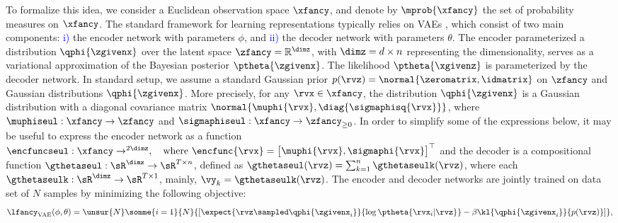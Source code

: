 \documentclass{article} %
\theoremstyle{plain}
\theoremstyle{definition}
\theoremstyle{remark}
\numberwithin{equation}{section}
\begin{document}
To formalize this idea, we consider a Euclidean observation space $\xfancy$, and denote by $\mprob{\xfancy}$ the set of probability measures on $\xfancy$. %
The standard framework for learning representations typically relies on VAEs \citep{Kingma2014}, which consist of two main components: \textcolor{blue}{i)} the encoder network with parameters $\phi$, and \textcolor{blue}{ii)} the decoder network with parameters $\theta$. The encoder parameterized a distribution $\qphi{\zgivenx}$ over the latent space $\zfancy=\mathbb{R}^{\dimz}$, with $\dimz=d \times n$ representing the dimensionality, serves as a variational approximation of the Bayesian posterior $\ptheta{\zgivenx}$. The likelihood $\ptheta{\xgivenz}$ is parameterized by the decoder network. In standard setup, we assume a standard Gaussian prior $p(\rvz)=\normal{\zeromatrix, \idmatrix}$ on $\zfancy$ and Gaussian distributions $\qphi{\zgivenx}$. More precisely, for any $\rvx \in \xfancy$, the distribution $\qphi{\zgivenx}$ is a Gaussian distribution with a diagonal covariance matrix $\normal{\muphi{\rvx}, \diag{\sigmaphisq{\rvx}}}$, where $\muphiseul: \xfancy \rightarrow \zfancy$ and $\sigmaphiseul : \xfancy \rightarrow \zfancy_{\geq 0}$. %
In order to simplify some of the expressions below, it may be useful to express the encoder network as a function 
$\encfuncseul : \xfancy \rightarrow \real^{2\dimz}, \quad \text{where } 
\encfunc{\rvx} = \begin{bmatrix}
\muphi{\rvx}, \sigmaphi{\rvx}\end{bmatrix}^\top$ and the decoder is a compositional function $\gthetaseul: \sR^{\dimz} \to \sR^{T \times n}$, defined as $\gthetaseul(\rvz) = \sum_{k=1}^{n}\gthetaseulk(\rvz)$, where each $\gthetaseulk: \sR^{\dimz} \to \sR^{T \times 1}$, mainly, $\vy_k = \gthetaseulk(\rvz)$. 
The encoder and decoder networks are jointly trained on data set of $N$ samples by minimizing the following objective: 
\begin{equation}\label{eq-loss-vae}
\lfancy_\text{VAE}(\phi,\theta) = \unsur{N} \somme{i=1}{N}{  \left[   \expect{\rvz \sampled \qphi{\zgivenx_i}}{\log \ptheta{\rvx_i| \rvz}} - \beta \kl{\qphi{\zgivenx_i}}{p(\rvz)}   \right]  },
\end{equation}
\end{document}
